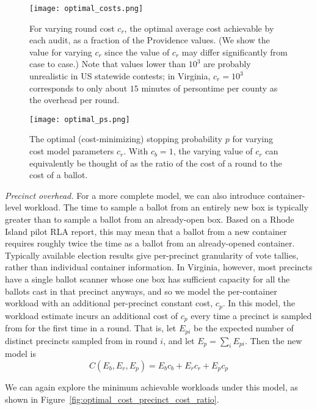 \begin{figure}
\texttt{[image: optimal\_costs.png]}
\caption{For varying round cost $c_r$, the optimal average cost achievable by each audit, as a fraction of the Providence values. (We show the value for varying $c_r$ since the value of $c_r$ may differ significantly from case to case.) Note that values lower than $10^3$ are probably unrealistic in US statewide contests; in Virginia, $c_r=10^3$ corresponds to only about $15$ minutes of persontime per county as the overhead per round.}
\label{fig:optimal_costs}
\end{figure}

\begin{figure}
\texttt{[image: optimal\_ps.png]}
\caption{The optimal (cost-minimizing) stopping probability $p$ for varying cost model parameters $c_r$. With $c_b=1$, the varying value of $c_r$ can equivalently be thought of as the ratio of the cost of a round to the cost of a ballot.}
\label{fig:optimal_ps}
\end{figure}


\emph{Precinct overhead.} For a more complete model, we can also introduce container-level workload. The time to sample a ballot from an entirely new box is typically greater than to sample a ballot from an already-open box. Based on a Rhode Island pilot RLA report\cite{RI-report}, this may mean that a ballot from a new container requires roughly twice the time as a ballot from an already-opened container. Typically available election results give per-precinct granularity of vote tallies, rather than individual container information. In Virginia, however, most precincts have a single ballot scanner whose one box has sufficient capacity for all the ballots cast in that precinct anyways, and so we model the per-container workload with an additional per-precinct constant cost, $c_p$. In this model, the workload estimate incurs an additional cost of $c_p$ every time a precinct is sampled from for the first time in a round. That is, let $E_{pi}$ be the expected number of distinct precincts sampled from in round $i$, and let $E_p=\sum_i E_{pi}$. Then the new model is
\begin{equation}
C(E_b, E_r, E_p) = E_b c_b + E_r c_r + E_p c_p
\label{eq:round_and_precinct_cost}
\end{equation}

We can again explore the minimum achievable workloads under this model, as shown in Figure~\ref{fig:optimal_cost_precinct_cost_ratio}.

